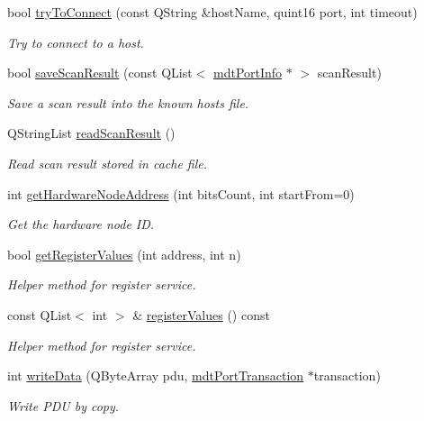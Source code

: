 \begin{DoxyCompactItemize}
bool \hyperlink{classmdt_modbus_tcp_port_manager_ab04f69b660487a7c59d309df7a8f5baa}{tryToConnect} (const QString \&hostName, quint16 port, int timeout)
\begin{DoxyCompactList}\small\item\em Try to connect to a host. \end{DoxyCompactList}\item 
bool \hyperlink{classmdt_modbus_tcp_port_manager_a3a1f5a54c93fa90ba83dea8785407da3}{saveScanResult} (const QList$<$ \hyperlink{classmdt_port_info}{mdtPortInfo} $\ast$ $>$ scanResult)
\begin{DoxyCompactList}\small\item\em Save a scan result into the known hosts file. \end{DoxyCompactList}\item 
QStringList \hyperlink{classmdt_modbus_tcp_port_manager_ab4d0a994973af6008faf489ca9ddb03d}{readScanResult} ()
\begin{DoxyCompactList}\small\item\em Read scan result stored in cache file. \end{DoxyCompactList}\item 
int \hyperlink{classmdt_modbus_tcp_port_manager_a4f52a477c264f809984e25abbc856db8}{getHardwareNodeAddress} (int bitsCount, int startFrom=0)
\begin{DoxyCompactList}\small\item\em Get the hardware node ID. \end{DoxyCompactList}\item 
bool \hyperlink{classmdt_modbus_tcp_port_manager_ab5e780409492b5f56326a870bc4262ec}{getRegisterValues} (int address, int n)
\begin{DoxyCompactList}\small\item\em Helper method for register service. \end{DoxyCompactList}\item 
const QList$<$ int $>$ \& \hyperlink{classmdt_modbus_tcp_port_manager_a99a13b5250a8523aa63869991581e56a}{registerValues} () const 
\begin{DoxyCompactList}\small\item\em Helper method for register service. \end{DoxyCompactList}\item 
int \hyperlink{classmdt_modbus_tcp_port_manager_a2a3ade6d3f9a6e7de47b9b089754288f}{writeData} (QByteArray pdu, \hyperlink{classmdt_port_transaction}{mdtPortTransaction} $\ast$transaction)
\begin{DoxyCompactList}\small\item\em Write PDU by copy. \end{DoxyCompactList}\end{DoxyCompactItemize}



